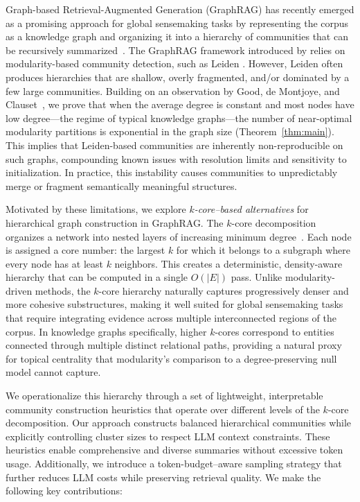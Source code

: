 \documentclass[sigconf]{acmart}
\begin{document}
Graph-based Retrieval-Augmented Generation (GraphRAG) has recently emerged as a promising approach for global sensemaking tasks by representing the corpus as a knowledge graph and organizing it into a hierarchy of communities that can be recursively summarized~\cite{han2025}. 
The GraphRAG framework introduced by \citeauthor{edge24} relies on modularity-based community detection, such as Leiden \cite{traag19}. However, Leiden often produces hierarchies that are shallow, overly fragmented, and/or dominated by a few large communities.
Building on an observation by Good, de Montjoye, and Clauset~\cite{good2010performance}, we prove that when the average degree is constant and most nodes have low degree---the regime of typical knowledge graphs---the number of near-optimal modularity partitions is exponential in the graph size (Theorem~\ref{thm:main}). This implies that Leiden-based communities are inherently non-reproducible on such graphs, compounding known issues with resolution limits and sensitivity to initialization.
In practice, this instability causes communities to unpredictably merge or fragment semantically meaningful structures.

Motivated by these limitations, we explore \emph{$k$-core–based alternatives} for hierarchical graph construction in GraphRAG. 
The $k$-core decomposition organizes a network into nested layers of increasing minimum degree~\cite{seidman83}. Each node is assigned a core number: the largest $k$ for which it belongs to a subgraph where every node has at least $k$ neighbors. 
This creates a deterministic, density-aware hierarchy that can be computed in a single $O(|E|)$ pass.
Unlike modularity-driven methods, the $k$-core hierarchy naturally captures progressively denser and more cohesive substructures, making it well suited for global sensemaking tasks that require integrating evidence across multiple interconnected regions of the corpus.
In knowledge graphs specifically, higher $k$-cores correspond to entities connected through multiple distinct relational paths, providing a natural proxy for topical centrality that modularity's comparison to a degree-preserving null model cannot capture.

We operationalize this hierarchy through a set of lightweight, interpretable community construction heuristics that operate over different levels of the $k$-core decomposition. 
Our approach constructs balanced hierarchical communities while explicitly controlling cluster sizes to respect LLM context constraints. These heuristics enable comprehensive and diverse summaries without excessive token usage.
Additionally, we introduce a token-budget–aware sampling strategy that further reduces LLM costs while preserving retrieval quality.
We make the following key contributions:
\end{document}
